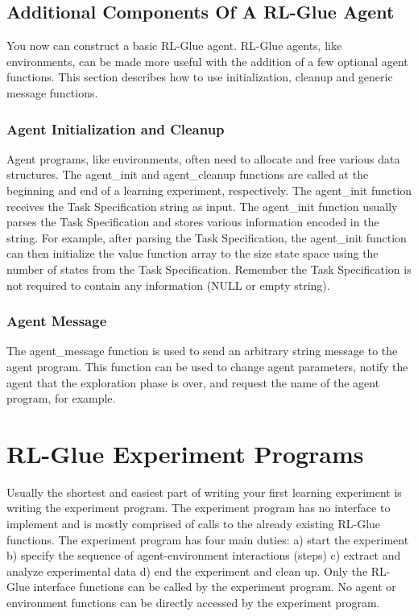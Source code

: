 \documentclass[11pt]{article}
\begin{document}
\subsection{Additional Components Of A RL-Glue Agent}
\label{agentp2}
You now can construct a basic RL-Glue agent. RL-Glue agents, like environments, can be made more useful with the addition of a few optional agent functions. This section describes how to use initialization, cleanup and generic message functions.

\subsubsection{Agent Initialization and Cleanup}
Agent programs, like environments, often need to allocate and free various data structures. The agent\_init and agent\_cleanup functions are called at the beginning and end of a learning experiment, respectively. The agent\_init function receives the Task Specification string as input. The agent\_init function usually parses the Task Specification and stores various information encoded in the string. For example, after parsing the Task Specification, the agent\_init function can then initialize the value function array to the size state space using the number of states from the Task Specification. Remember the Task Specification is not required to contain any information (NULL or empty string).      

\subsubsection{Agent Message}
The agent\_message function is used to send an arbitrary string message to the agent program. This function can be used to change agent parameters, notify the agent that the exploration phase is over, and request the name of the agent program, for example.



\section{RL-Glue Experiment Programs}
\label{exp}
Usually the shortest and easiest part of writing your first learning experiment is writing the experiment program. The experiment program has no interface to implement and is mostly comprised of calls to the already existing RL-Glue functions. The experiment program has four main duties: a) start the experiment b) specify the sequence of agent-environment interactions (steps) c) extract and analyze experimental data d) end the experiment and clean up.  Only the RL-Glue interface functions can be called by the experiment program. No agent or environment functions can be directly accessed by the experiment program.
\end{document}
